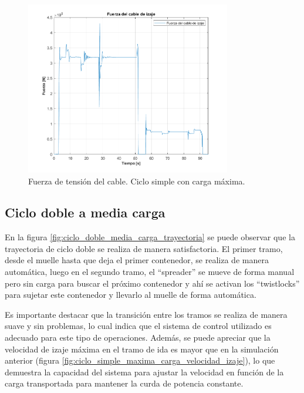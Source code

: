 \documentclass[11pt]{article}
\begin{document}
\begin{figure}%
	\centering
	\includegraphics[width=0.8\textwidth]{images/ciclo_simple_maxima_carga/FuerzadeIzaje.png}
	\caption{Fuerza de tensión del cable. Ciclo simple con carga máxima.}
	\label{fig:ciclo_simple_maxima_carga_fza_cable}
\end{figure}

\newpage

\subsection{Ciclo doble a media carga}

En la figura \ref{fig:ciclo_doble_media_carga_trayectoria} se puede observar que la trayectoria de ciclo doble se realiza de manera satisfactoria. El primer tramo, desde el muelle hasta que deja el primer contenedor, se realiza de manera automática, luego en el segundo tramo, el ``spreader'' se mueve de forma manual pero sin carga para buscar el próximo contenedor y ahí se activan los ``twistlocks'' para sujetar este contenedor y llevarlo al muelle de forma automática.

Es importante destacar que la transición entre los tramos se realiza de manera suave y sin problemas, lo cual indica que el sistema de control utilizado es adecuado para este tipo de operaciones. Además, se puede apreciar que la velocidad de izaje máxima en el tramo de ida es mayor que en la simulación anterior (figura \ref{fig:ciclo_simple_maxima_carga_velocidad_izaje}), lo que demuestra la capacidad del sistema para ajustar la velocidad en función de la carga transportada para mantener la curda de potencia constante.
\end{document}
